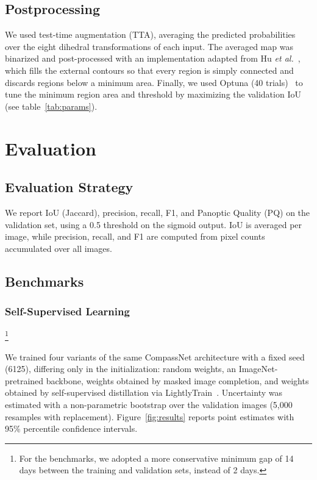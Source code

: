 \documentclass[sigconf]{acmart}
\begin{document}
\subsection{Postprocessing}\label{sec:postprocessing}
    We used test-time augmentation (TTA), averaging the predicted probabilities over the eight dihedral transformations of each input. The averaged map was binarized and post-processed with an implementation adapted from Hu \textit{et al.}~\cite{hu2026modernconvnetsolarfilament}, which fills the external contours so that every region is simply connected and discards regions below a minimum area. Finally, we used Optuna (40 trials)~\cite{akiba2019optuna} to tune the minimum region area and threshold by maximizing the validation IoU (see table~\ref{tab:params}).

\section{Evaluation}\label{sec:evaluation}

\subsection{Evaluation Strategy}
We report IoU (Jaccard), precision, recall, F1, and Panoptic Quality (PQ) on the validation set, using a 0.5 threshold on the sigmoid output. IoU is averaged per image, while precision, recall, and F1 are computed from pixel counts accumulated over all images.

\subsection{Benchmarks}
\subsubsection{Self-Supervised Learning}\footnote{For the benchmarks, we adopted a more conservative minimum gap of 14 days between the training and validation sets, instead of 2 days.}\mbox{}\

We trained four variants of the same CompassNet architecture with a fixed seed (6125), differing only in the initialization: random weights, an ImageNet-pretrained backbone, weights obtained by masked image completion, and weights obtained by self-supervised distillation via LightlyTrain~\cite{lightlytrain}. Uncertainty was estimated with a non-parametric bootstrap over the validation images (5{,}000 resamples with replacement). Figure~\ref{fig:results} reports point estimates with 95\% percentile confidence intervals.
\end{document}
